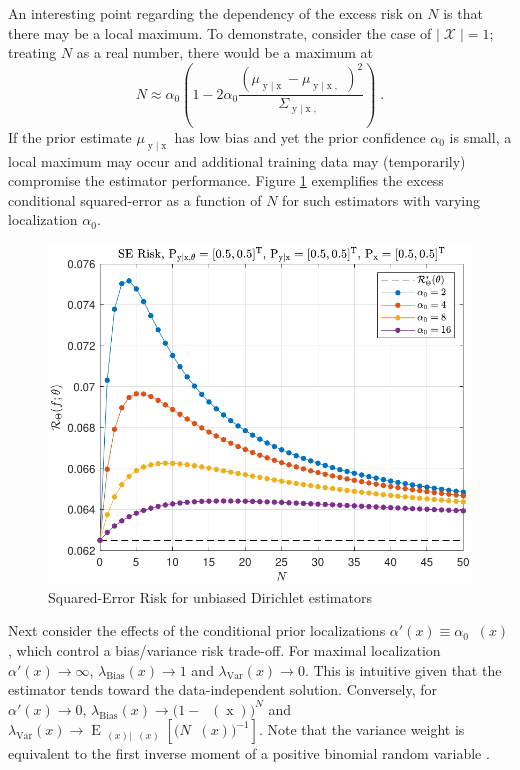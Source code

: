 \documentclass{article}
\DeclareMathOperator{\xrm}{\mathrm{x}}
\DeclareMathOperator{\yrm}{\mathrm{y}}
\DeclareMathOperator{\Erm}{\mathrm{E}}
\DeclareMathOperator{\Xcal}{\mathcal{X}}
\DeclareMathOperator{\upthetam}{\uptheta_\text{m}}
\DeclareMathOperator{\upthetac}{\uptheta_\text{c}}
\DeclareMathOperator{\uppsim}{\uppsi_\text{m}}
\DeclareMathOperator{\alpham}{\alpha_\text{m}}
\begin{document}
An interesting point regarding the dependency of the excess risk on $N$ is that there may be a local maximum. To demonstrate, consider the case of $|\Xcal| = 1$; treating $N$ as a real number, there would be a maximum at 
\begin{equation}
N \approx \alpha_0 \left( 1 - 2 \alpha_0 \frac{\left( \mu_{\yrm | \xrm} - \mu_{\yrm | \xrm,\upthetac} \right)^2}{\Sigma_{\yrm | \xrm,\upthetac}} \right) \;.
\end{equation}
If the prior estimate $\mu_{\yrm | \xrm}$ has low bias and yet the prior confidence $\alpha_0$ is small, a local maximum may occur and additional training data may (temporarily) compromise the estimator performance. Figure \ref{fig:Risk_cond_SE_Dir_N_leg_a0_unbiased} exemplifies the excess conditional squared-error as a function of $N$ for such estimators with varying localization $\alpha_0$. 
\begin{figure}
	\centering
	\includegraphics[width=0.9\linewidth]{Risk_cond_SE_Dir_N_leg_a0_unbiased.pdf}
	\caption{Squared-Error Risk for unbiased Dirichlet estimators}
	\label{fig:Risk_cond_SE_Dir_N_leg_a0_unbiased}
\end{figure}



Next consider the effects of the conditional prior localizations $\alpha'(x) \equiv \alpha_0 \alpham(x)$, which control a bias/variance risk trade-off. For maximal localization $\alpha'(x) \to \infty$, $\lambda_{\text{Bias}}(x) \to 1$ and $\lambda_{\text{Var}}(x) \to 0$. This is intuitive given that the estimator tends toward the data-independent solution. Conversely, for $\alpha'(x) \to 0$, $\lambda_{\text{Bias}}(x) \to \big( 1 - \upthetam(\xrm) \big)^N$ and $\lambda_{\text{Var}}(x) \to \Erm_{\uppsim(x) | \upthetam(x)}\left[ \big( N \uppsim(x) \big)^{-1} \right]$. Note that the variance weight is equivalent to the first inverse moment of a positive binomial random variable \cite{stephan}. 
\end{document}
